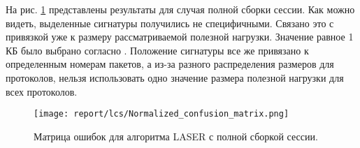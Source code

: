 \begin{table}[th!]
    \caption{Результаты классификации для алгоритма LASER с частичной сборкой сессии.}
    \label{report:laser_reasm}
    \centering
\end{table}

На рис. \ref{plt:lcs} представлены результаты для случая полной сборки сессии.
Как можно видеть, выделенные сигнатуры получились не специфичными.
Связано это с привязкой уже к размеру рассматриваемой полезной нагрузки.
Значение равное 1 КБ было выбрано согласно \cite{ye2009autosig}.
Положение сигнатуры все же привязано к определенным номерам пакетов,
а из-за разного распределения размеров для протоколов, нельзя использовать одно значение размера полезной нагрузки для всех протоколов.

\begin{figure}[H]
    \begin{center}
        \texttt{[image: report/lcs/Normalized\_confusion\_matrix.png]}
        \caption{Матрица ошибок для алгоритма LASER с полной сборкой сессии.}
        \label{plt:lcs}
    \end{center}
\end{figure}

\newpage
